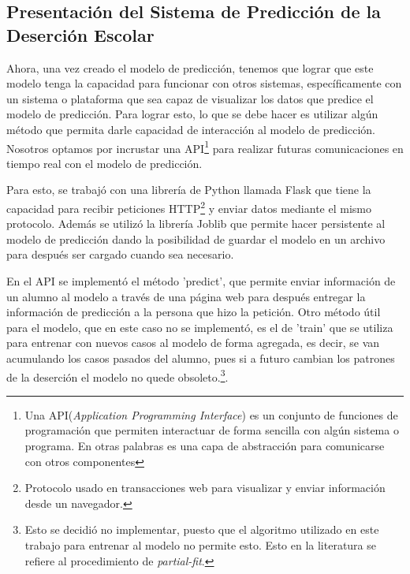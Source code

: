 \subsection{Presentación del Sistema de Predicción de la Deserción Escolar}
Ahora, una vez creado el modelo de predicción, tenemos que lograr que este modelo tenga la capacidad para funcionar con otros sistemas, específicamente con un sistema o plataforma que sea capaz de visualizar los datos que predice el modelo de predicción. Para lograr esto, lo que se debe hacer es utilizar algún método que permita darle capacidad de interacción al modelo de predicción. Nosotros optamos por incrustar una API\footnote{Una API(\textit{Application Programming Interface}) es un conjunto de funciones de programación que permiten interactuar de forma sencilla con algún sistema o programa. En otras palabras es una capa de abstracción para comunicarse con otros componentes} para realizar futuras comunicaciones en tiempo real con el modelo de predicción.

Para esto, se trabajó con una librería de Python llamada Flask que tiene la capacidad para recibir peticiones HTTP\footnote{Protocolo usado en transacciones web para visualizar y enviar información desde un navegador.} y enviar datos mediante el mismo protocolo. Además se utilizó la librería Joblib que permite hacer persistente al modelo de predicción dando la posibilidad de guardar el modelo en un archivo para después ser cargado cuando sea necesario.

En el API se implementó el método 'predict', que permite enviar información de un alumno al modelo a través de una página web para después entregar la información de predicción a la persona que hizo la petición. Otro método útil para el modelo, que en este caso no se implementó, es el de 'train' que se utiliza para entrenar con nuevos casos al modelo de forma agregada, es decir, se van acumulando los casos pasados del alumno, pues si a futuro cambian los patrones de la deserción el modelo no quede obsoleto.\footnote{Esto se decidió no implementar, puesto que el algoritmo utilizado en este trabajo para entrenar al modelo no permite esto. Esto en la literatura se refiere al procedimiento de \textit{partial-fit}.}.

